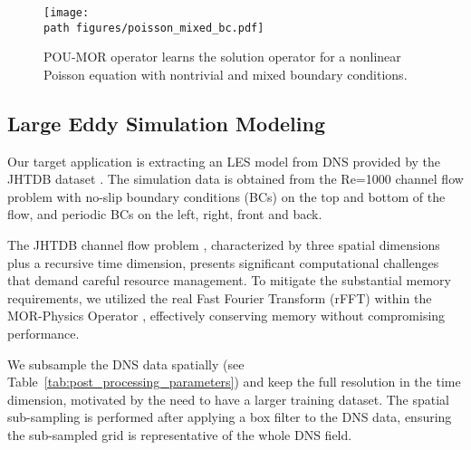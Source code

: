 \begin{figure}
    \centering
    \texttt{[image: \\path figures/poisson\_mixed\_bc.pdf]}
    \caption{POU-MOR operator learns the solution operator for a nonlinear Poisson equation with nontrivial and mixed boundary conditions.}
    \label{fig:poisson}
\end{figure}


\subsection{Large Eddy Simulation Modeling}\label{sec:les}


Our target application is extracting an LES model from DNS provided by the JHTDB dataset \cite{graham2016JHTDB_channel}. The simulation data is obtained from the  Re=1000 channel flow problem with no-slip boundary conditions (BCs) on the top and bottom of the flow, and periodic BCs on the left, right, front and back.

The JHTDB channel flow problem \cite{graham2016JHTDB_channel}, characterized by three spatial dimensions plus a recursive time dimension, presents significant computational challenges that demand careful resource management. To mitigate the substantial memory requirements, we utilized the real Fast Fourier Transform (rFFT) within the MOR-Physics Operator \cite{patel2021MOR_Operator2}, effectively conserving memory without compromising performance.



We subsample the DNS data spatially (see Table~\ref{tab:post_processing_parameters}) and keep the full resolution in the time dimension, motivated by the need to have a larger training dataset. The spatial sub-sampling is performed after applying a box filter to the DNS data, ensuring the sub-sampled grid is representative of the whole DNS field. 

